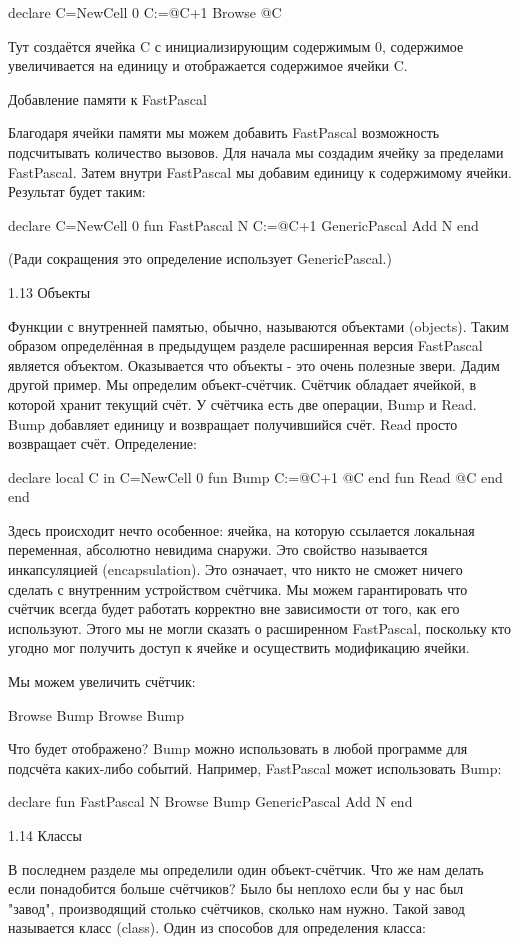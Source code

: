 declare
C={NewCell 0}
C:=@C+1
{Browse @C}

Тут создаётся ячейка C с инициализирующим содержимым 0, содержимое увеличивается на единицу и отображается содержимое ячейки C.

Добавление памяти к FastPascal

Благодаря ячейки памяти мы можем добавить FastPascal возможность подсчитывать количество вызовов. Для начала мы создадим ячейку за пределами FastPascal. Затем внутри FastPascal мы добавим единицу к содержимому ячейки. Результат будет таким:

declare
C={NewCell 0}
fun {FastPascal N}
C:=@C+1
{GenericPascal Add N}
end

(Ради сокращения это определение использует GenericPascal.)

1.13 Объекты

Функции с внутренней памятью, обычно, называются объектами (objects). Таким образом определённая в предыдущем разделе расширенная версия FastPascal является объектом. Оказывается что объекты - это очень полезные звери. Дадим другой пример. Мы определим объект-счётчик. Счётчик обладает ячейкой, в которой хранит текущий счёт. У счётчика есть две операции, Bump и Read. Bump добавляет единицу и возвращает получившийся счёт. Read просто возвращает счёт. Определение:

declare
local C in
C={NewCell 0}
fun {Bump}
C:=@C+1
@C
end
fun {Read}
@C
end
end

Здесь происходит нечто особенное: ячейка, на которую ссылается локальная переменная, абсолютно невидима снаружи. Это свойство называется инкапсуляцией (encapsulation). Это означает, что никто не сможет ничего сделать с внутренним устройством счётчика. Мы можем гарантировать что счётчик всегда будет работать корректно вне зависимости от того, как его используют. Этого мы не могли сказать о расширенном FastPascal, поскольку кто угодно мог получить доступ к ячейке и осуществить модификацию ячейки.

Мы можем увеличить счётчик:

{Browse {Bump}}
{Browse {Bump}}

Что будет отображено? Bump можно использовать в любой программе для подсчёта каких-либо событий. Например, FastPascal может использовать Bump:

declare
fun {FastPascal N}
{Browse {Bump}}
{GenericPascal Add N}
end

1.14 Классы

В последнем разделе мы определили один объект-счётчик. Что же нам делать если понадобится больше счётчиков? Было бы неплохо если бы у нас был "завод", производящий столько счётчиков, сколько нам нужно. Такой завод называется класс (class). Один из способов для определения класса:

